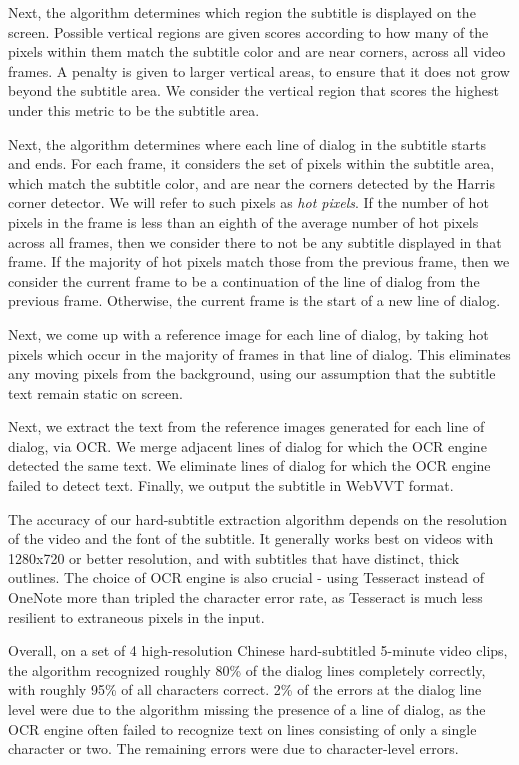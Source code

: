 \documentclass{sigchi}
\begin{document}
Next, the algorithm determines which region the subtitle is displayed on the screen. Possible vertical regions are given scores according to how many of the pixels within them match the subtitle color and are
near corners, across all video frames. A penalty is given to larger vertical
areas, to ensure that it does not grow beyond the subtitle area. We consider the vertical region
that scores the highest under this metric to be the subtitle area.

Next, the algorithm determines where each line of dialog in the subtitle
starts and ends. For each frame, it considers the set of pixels within the subtitle area,
which match the subtitle color, and are near the corners detected by the Harris corner detector. We will refer to such pixels as \emph{hot pixels}. If the number of hot pixels in the frame is less than
an eighth of the average number of hot pixels across all frames,
then we consider there to not be any subtitle displayed in that frame.
If the majority of hot pixels match those from the previous frame, then
we consider the current frame to be a continuation of the line of dialog from the previous frame.
Otherwise, the current frame is the start of a new line of dialog.

Next, we come up with a reference image for each line of dialog, by taking hot pixels which occur in the majority of frames in that line of dialog. This eliminates any moving pixels from the background, using our
assumption that the subtitle text remain static on screen.

Next, we extract the text from the reference images generated for each line of dialog, via OCR. We merge adjacent lines of dialog for which the OCR engine detected the same text. We eliminate lines of dialog for which the OCR engine failed to detect text. Finally, we output the subtitle in WebVVT format.

The accuracy of our hard-subtitle extraction algorithm depends on the resolution of the video and
the font of the subtitle. It generally works best on videos with 1280x720 or better resolution, and with subtitles that have distinct, thick outlines. The choice of OCR engine is also crucial - using Tesseract instead of OneNote more than tripled the character error rate,
as Tesseract is much less resilient to extraneous pixels in the input.

Overall, on a set of 4 high-resolution Chinese hard-subtitled 5-minute video clips, the algorithm recognized roughly 80\% of the dialog lines completely correctly, with roughly 95\% of all characters correct. 2\% of the errors at the dialog line level were due to the algorithm missing the presence of a line of dialog, as the OCR engine often failed to recognize text on lines consisting of only a single character or two. The remaining errors were due to character-level errors.
\end{document}
